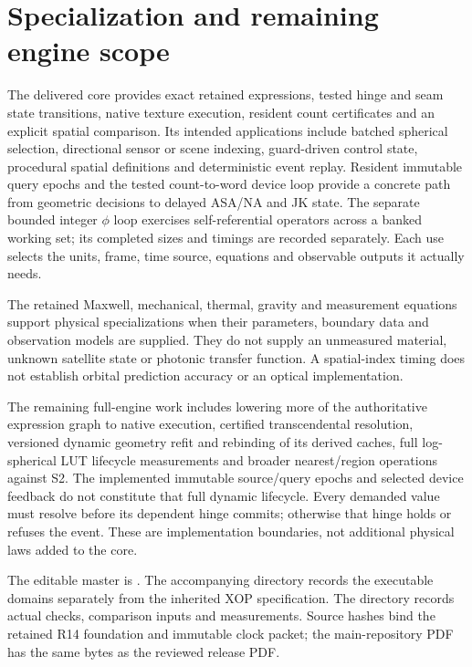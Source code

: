 \section{Specialization and remaining engine scope}
The delivered core provides exact retained expressions, tested hinge and seam
state transitions, native texture execution, resident count certificates and
an explicit spatial comparison. Its intended applications include batched spherical selection,
directional sensor or scene indexing, guard-driven control state, procedural
spatial definitions and deterministic event replay. Resident immutable query
epochs and the tested count-to-word device loop provide a concrete path from
geometric decisions to delayed ASA/NA and JK state. The separate bounded
integer $\phi$ loop exercises self-referential operators across a banked
working set; its completed sizes and timings are recorded separately.
Each use selects the
units, frame, time source, equations and observable outputs it actually needs.

The retained Maxwell, mechanical, thermal, gravity and measurement equations
support physical specializations when their parameters, boundary data and
observation models are supplied. They do not supply an unmeasured material,
unknown satellite state or photonic transfer function. A spatial-index timing
does not establish orbital prediction accuracy or an optical implementation.

The remaining full-engine work includes lowering more of the authoritative
expression graph to native execution, certified transcendental resolution,
versioned dynamic geometry refit and rebinding of its derived caches,
full log-spherical LUT lifecycle measurements and broader nearest/region
operations against S2. The implemented immutable source/query epochs and
selected device feedback do not constitute that full dynamic lifecycle.
Every demanded value must resolve before its dependent hinge commits;
otherwise that hinge holds or refuses the event. These are implementation boundaries,
not additional physical laws added to the core.

The editable master is . The accompanying
 directory records the executable domains separately from the
inherited XOP specification. The  directory records actual
checks, comparison inputs and measurements. Source hashes bind the retained
R14 foundation and immutable clock packet; the main-repository PDF has the
same bytes as the reviewed release PDF.
